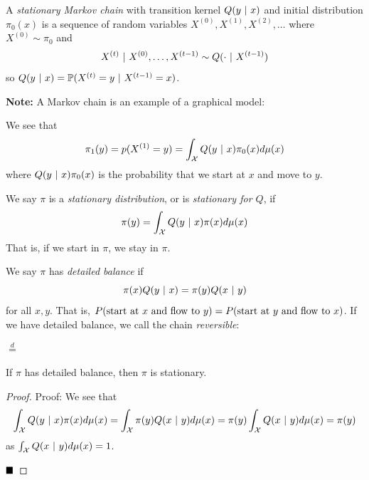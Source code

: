 \begin{definition}
    A \emph{stationary Markov chain} with transition kernel $Q(y \given x)$ and initial distribution $\pi_0(x)$ is a sequence of random variables $X^{(0)}, X^{(1)}, X^{(2)}, \ldots$ where $X^{(0)} \sim \pi_0$ and
    \[ X^{(t)} \given X^{(0)}, \ldots, X^{(t - 1)} \sim Q(\cdot \given X^{(t - 1)}) \]
    so $Q(y \given x) = \bb{P}(X^{(t)} = y \given X^{(t - 1)} = x)$.
\end{definition}

\textbf{Note:} A Markov chain is an example of a graphical model:
\begin{center}
\end{center}
We see that
\[ \pi_1(y) = p(X^{(1)} = y) = \int_{\cal{X}} Q(y \given x)\pi_0(x)d\mu(x) \]
where $Q(y \given x)\pi_0(x)$ is the probability that we start at $x$ and move to $y$.

\begin{definition}
    We say $\pi$ is a \emph{stationary distribution}, or is \emph{stationary for $Q$}, if
    \[ \pi(y) = \int_{\cal{X}} Q(y \given x)\pi(x)d\mu(x) \]
    That is, if we start in $\pi$, we stay in $\pi$.
\end{definition}

\begin{definition}
    We say $\pi$ has \emph{detailed balance} if
    \[ \pi(x)Q(y \given x) = \pi(y)Q(x \given y) \]
    for all $x, y$. That is, $P(\tt{start at } x \tt{ and flow to } y) = P(\tt{start at } y \tt{ and flow to } x)$. If we have detailed balance, we call the chain \emph{reversible}:
    \begin{center}
        $\overset{d}{=}$
    \end{center}
\end{definition}

\begin{lemma}
    If $\pi$ has detailed balance, then $\pi$ is stationary.
\end{lemma}
\begin{proof}{Proof:}
    We see that
    \[ \int_{\cal{X}} Q(y \given x)\pi(x)d\mu(x) = \int_{\cal{X}} \pi(y)Q(x \given y)d\mu(x) = \pi(y)\int_{\cal{X}} Q(x \given y)d\mu(x) = \pi(y) \]
    as $\int_{\cal{X}} Q(x \given y)d\mu(x) = 1$.

    $\qed$
\end{proof}

